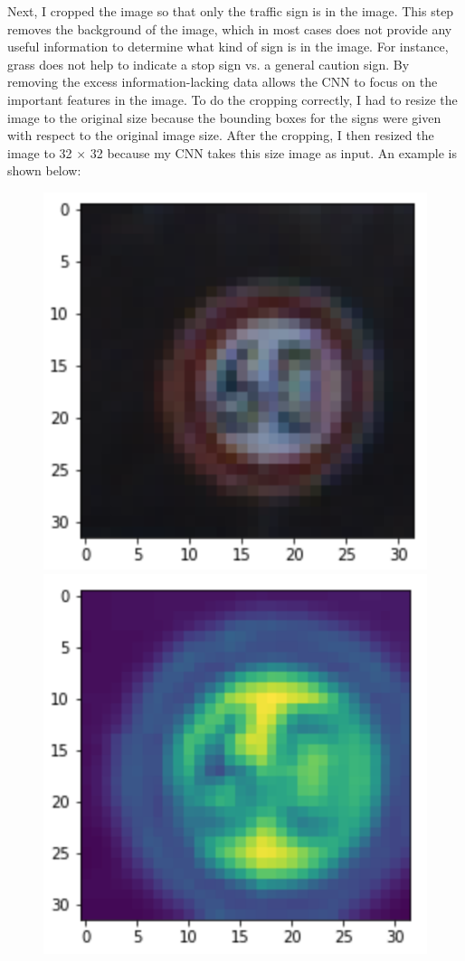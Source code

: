 \documentclass[12pt]{article}
\begin{document}
Next, I cropped the image so that only the traffic sign is in the image. This step removes the background of the image, which in most cases does not provide any useful information to determine what kind of sign is in the image. For instance, grass does not help to indicate a stop sign vs. a general caution sign. By removing the excess information-lacking data allows the CNN to focus on the important features in the image. To do the cropping correctly, I had to resize the image to the original size because the bounding boxes for the signs were given with respect to the original image size. After the cropping, I then resized the image to 32 $\times$ 32 because my CNN takes this size image as input. An example is shown below:
\begin{figure}[!h]
\includegraphics[scale = 0.5]{writeup_images/im1.png}
\includegraphics[scale = 0.5]{writeup_images/cropped.png}
\end{figure}
\end{document}

